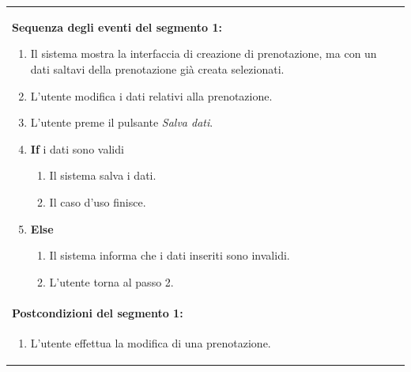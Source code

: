 \documentclass{article}
\begin{document}
\begin{table}[H]
\begin{tabular}{|p{\linewidth}|}
                        \vspace{-5pt} \\
                        \hline
                        \textbf{Sequenza degli eventi del segmento 1:}
                        \begin{enumerate}
                            \item Il sistema mostra la interfaccia di creazione di prenotazione, ma con un dati saltavi della prenotazione già creata selezionati. %
                            \item L'utente modifica i dati relativi alla prenotazione.
                            \item L'utente preme il pulsante \emph{Salva dati}.
                            \item \textbf{If} i dati sono validi
                            \begin{enumerate}
                                \item Il sistema salva i dati.
                                \item Il caso d'uso finisce.
                            \end{enumerate}
                            \item \textbf{Else}
                            \begin{enumerate}
                                \item Il sistema informa che i dati inseriti sono invalidi.
                                \item L'utente torna al passo 2.
                            \end{enumerate}
                        \end{enumerate} \\
                        \hline
                        \cellcolor{gray!20}
                        \textbf{Postcondizioni del segmento 1:} \\
                        \cellcolor{gray!20}
                        \begin{minipage}{\linewidth}
                            \begin{enumerate}
                                \item L'utente effettua la modifica di una prenotazione.
                            \end{enumerate}
                        \end{minipage} \\
                        \hline
                    \end{tabular}
                \end{table}
\end{document}
